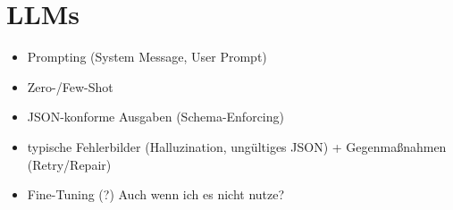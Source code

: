 \section{LLMs}\label{sec:llms}

\begin{itemize}
    \item Prompting (System Message, User Prompt)
    \item Zero-/Few-Shot
    \item JSON-konforme Ausgaben (Schema-Enforcing)
    \item typische Fehlerbilder (Halluzination, ungültiges JSON) + Gegenmaßnahmen (Retry/Repair)
    \item Fine-Tuning (?) Auch wenn ich es nicht nutze?
\end{itemize}